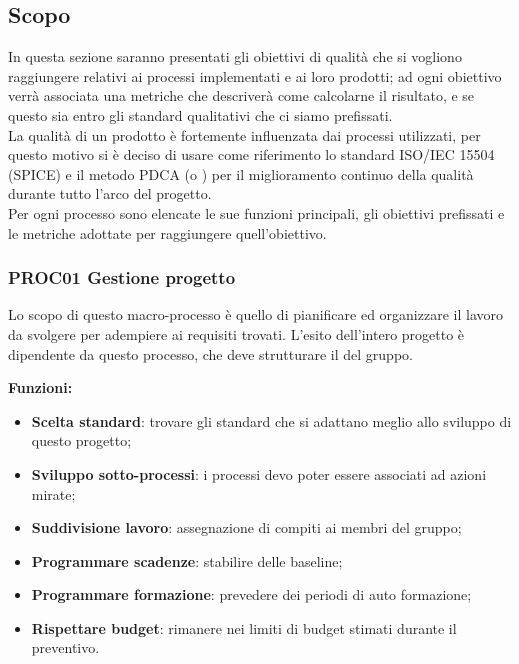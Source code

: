 \documentclass[../piano_di_qualifica.tex]{subfiles}
\begin{document}
\subsection{Scopo}
In questa sezione saranno presentati gli obiettivi di qualità che si vogliono raggiungere relativi ai processi implementati e ai loro prodotti; ad ogni obiettivo verrà associata una metriche che descriverà come calcolarne il risultato, e se questo sia entro gli standard qualitativi che ci siamo prefissati.\\
La qualità di un prodotto è fortemente influenzata dai processi utilizzati, per questo motivo si è deciso di usare come riferimento lo standard ISO/IEC 15504 (SPICE)  e il metodo PDCA (o ) per il miglioramento continuo della qualità durante tutto l'arco del progetto.\\
Per ogni processo sono elencate le sue funzioni principali, gli obiettivi prefissati e le metriche adottate per raggiungere quell’obiettivo.

\subsubsection{PROC01 Gestione progetto}
Lo scopo di questo macro-processo è quello di pianificare ed organizzare il lavoro da svolgere per adempiere ai requisiti trovati. L'esito dell'intero progetto è dipendente da questo processo, che deve strutturare il  del gruppo.

\setlength{\parindent}{0pt}\textbf{Funzioni:}
\smallbreak
\begin{itemize}
	\item \textbf{Scelta standard}: trovare gli standard che si adattano meglio allo sviluppo di questo progetto;
	\item \textbf{Sviluppo sotto-processi}: i processi devo poter essere associati ad azioni mirate;
	\item \textbf{Suddivisione lavoro}: assegnazione di compiti ai membri del gruppo;
	\item \textbf{Programmare scadenze}: stabilire delle baseline;
	\item \textbf{Programmare formazione}: prevedere dei periodi di auto formazione;
	\item \textbf{Rispettare budget}: rimanere nei limiti di budget stimati durante il preventivo.
\end{itemize}
\end{document}
